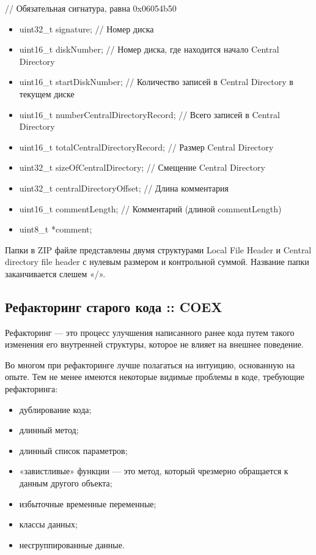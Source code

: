 // Обязательная сигнатура, равна 0x06054b50
\begin{itemize}
\item uint32\_t signature; // Номер диска
\item uint16\_t diskNumber;   // Номер диска, где находится начало Central Directory
\item uint16\_t startDiskNumber;    // Количество записей в Central Directory в текущем диске
\item uint16\_t numberCentralDirectoryRecord;    // Всего записей в Central Directory
\item uint16\_t totalCentralDirectoryRecord;    // Размер Central Directory
\item uint32\_t sizeOfCentralDirectory;    // Смещение Central Directory
\item uint32\_t centralDirectoryOffset;    // Длина комментария
\item uint16\_t commentLength;    // Комментарий (длиной commentLength)
\item uint8\_t *comment;
\end{itemize}

Папки в ZIP файле представлены двумя структурами Local File Header и Central directory file header с нулевым размером и контрольной суммой. Название папки заканчивается слешем «/».

\subsection{Рефакторинг старого кода :: COEX}

Рефакторинг — это процесс улучшения написанного ранее кода путем такого изменения его внутренней структуры, которое не влияет на внешнее поведение.

Во многом при рефакторинге лучше полагаться на интуицию, основанную на опыте. Тем не менее имеются некоторые видимые проблемы в коде, требующие рефакторинга:

\begin{itemize}
\item дублирование кода;
\item длинный метод;
\item длинный список параметров;
\item «завистливые» функции — это метод, который чрезмерно обращается к данным другого объекта;
\item избыточные временные переменные;
\item классы данных;
\item несгруппированные данные.
\end{itemize}

